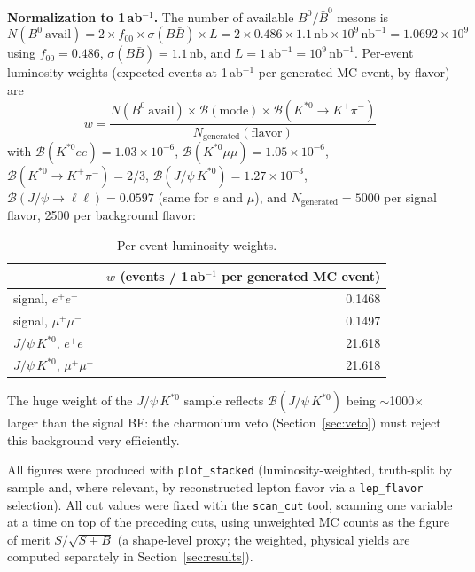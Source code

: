 \documentclass[11pt]{article}
\newcommand{\BF}{\mathcal{B}}
\newcommand{\Kst}{K^{*0}}
\newcommand{\jpsi}{J/\psi}
\begin{document}
\textbf{Normalization to 1\,ab$^{-1}$.} The number of available
$B^0/\bar B^0$ mesons is
\begin{equation*}
N(B^0\ \text{avail})
 = 2 \times f_{00} \times \sigma(B\bar B) \times L
 = 2 \times 0.486 \times 1.1\,\text{nb} \times 10^{9}\,\text{nb}^{-1}
 = 1.0692\times 10^{9}
\end{equation*}
using $f_{00} = 0.486$, $\sigma(B\bar B) = 1.1$\,nb, and
$L = 1\,\text{ab}^{-1} = 10^{9}\,\text{nb}^{-1}$. Per-event luminosity
weights (expected events at 1\,ab$^{-1}$ per generated MC event, by
flavor) are
\begin{equation*}
w = \frac{N(B^0\ \text{avail}) \times \BF(\text{mode}) \times
          \BF(\Kst\to K^{+}\pi^{-})}{N_{\mathrm{generated}}(\text{flavor})}
\end{equation*}
with $\BF(\Kst ee) = 1.03\times 10^{-6}$,
$\BF(\Kst\mu\mu) = 1.05\times 10^{-6}$,
$\BF(\Kst\to K^{+}\pi^{-}) = 2/3$,
$\BF(\jpsi\,\Kst) = 1.27\times 10^{-3}$,
$\BF(\jpsi\to\ell\ell) = 0.0597$ (same for $e$ and $\mu$), and
$N_{\mathrm{generated}} = 5000$ per signal flavor, 2500 per background
flavor:

\begin{table}[htbp]
\centering
\begin{tabular}{lr}
\toprule
 & $w$ (events / 1\,ab$^{-1}$ per generated MC event) \\
\midrule
signal, $e^+e^-$ & 0.1468 \\
signal, $\mu^+\mu^-$ & 0.1497 \\
$\jpsi\,\Kst$, $e^+e^-$ & 21.618 \\
$\jpsi\,\Kst$, $\mu^+\mu^-$ & 21.618 \\
\bottomrule
\end{tabular}
\caption{Per-event luminosity weights.}
\label{tab:weights}
\end{table}

The huge weight of the $\jpsi\,\Kst$ sample reflects
$\BF(\jpsi\,\Kst)$ being $\sim$1000$\times$ larger than the signal BF:
the charmonium veto (Section~\ref{sec:veto}) must reject this background
very efficiently.

All figures were produced with \texttt{plot\_stacked}
(luminosity-weighted, truth-split by sample and, where relevant, by
reconstructed lepton flavor via a \texttt{lep\_flavor} selection). All
cut values were fixed with the \texttt{scan\_cut} tool, scanning one
variable at a time on top of the preceding cuts, using unweighted MC
counts as the figure of merit $S/\sqrt{S+B}$ (a shape-level proxy; the
weighted, physical yields are computed separately in
Section~\ref{sec:results}).
\end{document}
